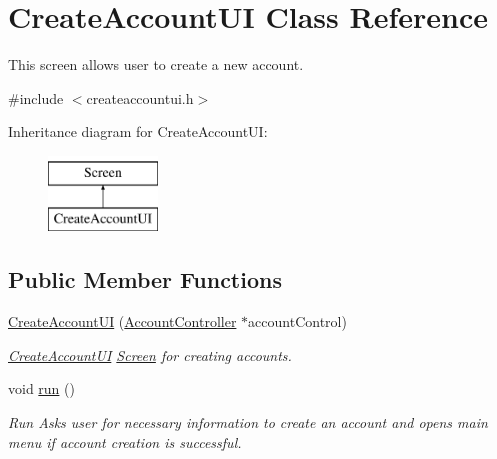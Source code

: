 \hypertarget{classCreateAccountUI}{}\section{Create\+Account\+UI Class Reference}
\label{classCreateAccountUI}


This screen allows user to create a new account.  




{\ttfamily \#include $<$createaccountui.\+h$>$}

Inheritance diagram for Create\+Account\+UI\+:\begin{figure}[H]
\begin{center}
\leavevmode
\includegraphics[height=2.000000cm]{classCreateAccountUI}
\end{center}
\end{figure}
\subsection*{Public Member Functions}
\begin{DoxyCompactItemize}
\item 
\hyperlink{classCreateAccountUI_ac37c643c9138d5a92b6620b15284902f}{Create\+Account\+UI} (\hyperlink{classAccountController}{Account\+Controller} $\ast$account\+Control)
\begin{DoxyCompactList}\small\item\em \hyperlink{classCreateAccountUI}{Create\+Account\+UI} \hyperlink{classScreen}{Screen} for creating accounts. \end{DoxyCompactList}\item 
void \hyperlink{classCreateAccountUI_ac71aa9ecb23945b891ec66b04fc99561}{run} ()\hypertarget{classCreateAccountUI_ac71aa9ecb23945b891ec66b04fc99561}{}\label{classCreateAccountUI_ac71aa9ecb23945b891ec66b04fc99561}

\begin{DoxyCompactList}\small\item\em Run Asks user for necessary information to create an account and opens main menu if account creation is successful. \end{DoxyCompactList}\end{DoxyCompactItemize}

